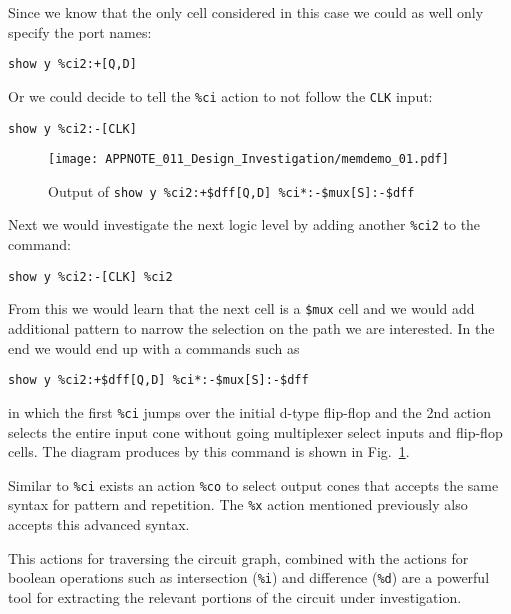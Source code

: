 \documentclass[9pt,technote,a4paper]{IEEEtran}
\begin{document}
Since we know that the only cell considered in this case we could as well only
specify the port names:

\begin{verbatim}
show y %ci2:+[Q,D]
\end{verbatim}

Or we could decide to tell the {\tt \%ci} action to not follow the {\tt CLK} input:

\begin{verbatim}
show y %ci2:-[CLK]
\end{verbatim}

\begin{figure}[b]
\texttt{[image: APPNOTE\_011\_Design\_Investigation/memdemo\_01.pdf]} \\
\caption{Output of {\tt show y \%ci2:+\$dff[Q,D] \%ci*:-\$mux[S]:-\$dff}}
\label{memdemo_01}
\end{figure}

Next we would investigate the next logic level by adding another {\tt \%ci2} to
the command:

\begin{verbatim}
show y %ci2:-[CLK] %ci2
\end{verbatim}

From this we would learn that the next cell is a {\tt \$mux} cell and we would add additional
pattern to narrow the selection on the path we are interested. In the end we would end up
with a commands such as

\begin{verbatim}
show y %ci2:+$dff[Q,D] %ci*:-$mux[S]:-$dff
\end{verbatim}

in which the first {\tt \%ci} jumps over the initial d-type flip-flop and the
2nd action selects the entire input cone without going multiplexer select
inputs and flip-flop cells. The diagram produces by this command is shown in
Fig.~\ref{memdemo_01}.

\medskip

Similar to {\tt \%ci} exists an action {\tt \%co} to select output cones that
accepts the same syntax for pattern and repetition. The {\tt \%x} action mentioned
previously also accepts this advanced syntax.

This actions for traversing the circuit graph, combined with the actions for
boolean operations such as intersection ({\tt \%i}) and difference ({\tt \%d})
are a powerful tool for extracting the relevant portions of the circuit under
investigation.
\end{document}
